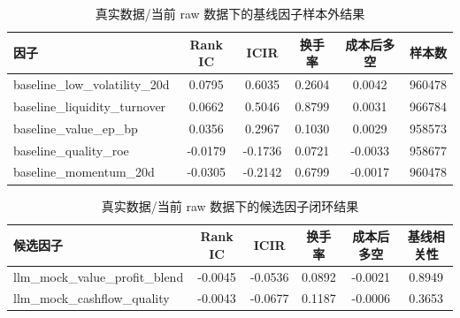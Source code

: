 \begin{table}[H]
  \centering
  \caption{真实数据/当前 raw 数据下的基线因子样本外结果}
  \label{tab:real-baselines}
  \begin{tabular}{lccccc}
    \toprule
    因子 & Rank IC & ICIR & 换手率 & 成本后多空 & 样本数 \\
    \midrule
    baseline\_low\_volatility\_20d & 0.0795 & 0.6035 & 0.2604 & 0.0042 & 960478 \\
    baseline\_liquidity\_turnover & 0.0662 & 0.5046 & 0.8799 & 0.0031 & 966784 \\
    baseline\_value\_ep\_bp & 0.0356 & 0.2967 & 0.1030 & 0.0029 & 958573 \\
    baseline\_quality\_roe & -0.0179 & -0.1736 & 0.0721 & -0.0033 & 958677 \\
    baseline\_momentum\_20d & -0.0305 & -0.2142 & 0.6799 & -0.0017 & 960478 \\
    \bottomrule
  \end{tabular}
\end{table}

\begin{table}[H]
  \centering
  \caption{真实数据/当前 raw 数据下的候选因子闭环结果}
  \label{tab:real-agent-factors}
  \begin{tabular}{lccccc}
    \toprule
    候选因子 & Rank IC & ICIR & 换手率 & 成本后多空 & 基线相关性 \\
    \midrule
    llm\_mock\_value\_profit\_blend & -0.0045 & -0.0536 & 0.0892 & -0.0021 & 0.8949 \\
    llm\_mock\_cashflow\_quality & -0.0043 & -0.0677 & 0.1187 & -0.0006 & 0.3653 \\
    \bottomrule
  \end{tabular}
\end{table}
